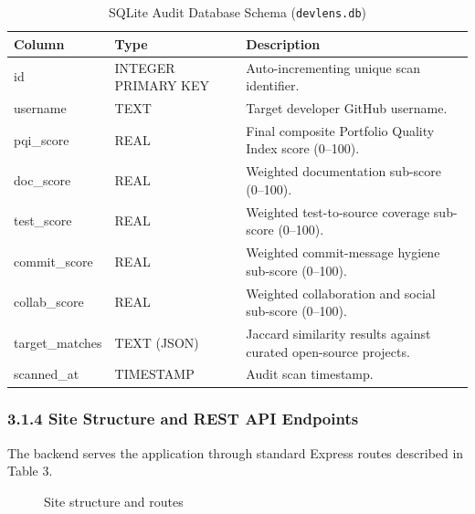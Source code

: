 \documentclass[12pt,a4paper]{article}
\begin{document}
\begin{table}[h!]
\centering
\caption{SQLite Audit Database Schema (\texttt{devlens.db})}
\label{tab:dbschema}
\small
\begin{tabularx}{\textwidth}{|p{3cm}|p{2.5cm}|X|}
\hline
\textbf{Column} & \textbf{Type} & \textbf{Description} \\ \hline
id & INTEGER PRIMARY KEY & Auto-incrementing unique scan identifier. \\ \hline
username & TEXT & Target developer GitHub username. \\ \hline
pqi\_score & REAL & Final composite Portfolio Quality Index score (0--100). \\ \hline
doc\_score & REAL & Weighted documentation sub-score (0--100). \\ \hline
test\_score & REAL & Weighted test-to-source coverage sub-score (0--100). \\ \hline
commit\_score & REAL & Weighted commit-message hygiene sub-score (0--100). \\ \hline
collab\_score & REAL & Weighted collaboration and social sub-score (0--100). \\ \hline
target\_matches & TEXT (JSON) & Jaccard similarity results against curated open-source projects. \\ \hline
scanned\_at & TIMESTAMP & Audit scan timestamp. \\ \hline
\end{tabularx}
\end{table}

\subsubsection{3.1.4 Site Structure and REST API Endpoints}
The backend serves the application through standard Express routes described in Table 3.

\begin{figure}[h!]
\centering
\vspace{0.3cm}
\vspace{0.3cm}
\caption{Site structure and routes}
\end{figure}
\end{document}
